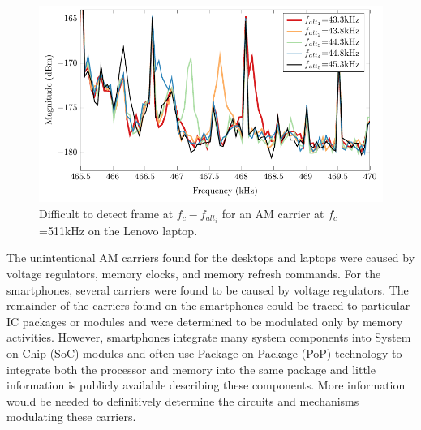 \begin{figure}[htb]
\centering
\includegraphics[width=5in]{../eucap_fase/Drawing/sb_hard.pdf}
\caption{Difficult to detect frame at $f_c-f_{alt_i}$ for an AM carrier at $f_c$=511kHz on the Lenovo laptop.}
\label{sb_hard}
\end{figure}


The unintentional AM carriers found for the desktops and laptops were caused by voltage regulators, memory clocks, and memory refresh commands. For the smartphones, several carriers were found to be caused by voltage regulators. The remainder of the carriers found on the smartphones could be traced to particular IC packages or modules and were determined to be modulated only by memory activities. However, smartphones integrate many system components into System on Chip (SoC) modules and often use Package on Package (PoP) technology to integrate both the processor and memory into the same package and little information is publicly available describing these components. More information would be needed to definitively determine the circuits and mechanisms modulating these carriers.

